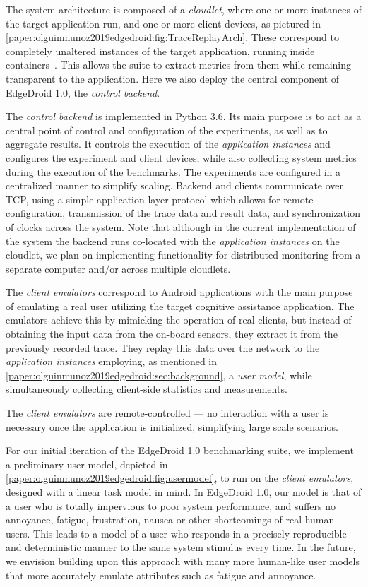 
The system architecture is composed of a \emph{cloudlet}, where one or more instances of the target application run, and one or more client devices, as pictured in \cref{paper:olguinmunoz2019edgedroid:fig:TraceReplayArch}.
These correspond to completely unaltered instances of the target application, running inside containers~\cite{docker}.
This allows the suite to extract metrics from them while remaining transparent to the application.
Here we also deploy the central component of EdgeDroid 1.0, the \emph{control backend}.

The \emph{control backend} is implemented in Python 3.6.
Its main purpose is to act as a central point of control and configuration of the experiments, as well as to aggregate results.
It controls the execution of the \emph{application instances} and configures the experiment and client devices, while also collecting system metrics during the execution of the benchmarks.
The experiments are configured in a centralized manner to simplify scaling.
Backend and clients communicate over TCP, using a simple application-layer protocol which allows for remote configuration, transmission of the trace data and result data, and synchronization of clocks across the system.
Note that although in the current implementation of the system the backend runs co-located with the \emph{application instances} on the cloudlet, we plan on implementing functionality for distributed monitoring from a separate computer and/or across multiple cloudlets.

The \emph{client emulators} correspond to Android applications with the main purpose of emulating a real user utilizing the target cognitive assistance application.
The emulators achieve this by mimicking the operation of real clients, but instead of obtaining the input data from the on-board sensors, they extract it from the previously recorded trace.
They replay this data over the network to the \emph{application instances} employing, as mentioned in \cref{paper:olguinmunoz2019edgedroid:sec:background}, a \emph{user model}, while simultaneously collecting client-side statistics and measurements.

The \emph{client emulators} are remote-controlled --- no interaction with a user is necessary once the application is initialized, simplifying large scale scenarios.

For our initial iteration of the EdgeDroid 1.0 benchmarking suite, we implement a preliminary user model, depicted in \cref{paper:olguinmunoz2019edgedroid:fig:usermodel}, to run on the \emph{client emulators}, designed with a linear task model in mind.
In EdgeDroid 1.0, our model is that of a user who is totally impervious to poor system performance, and suffers no annoyance, fatigue, frustration, nausea or other shortcomings of real human users.
This leads to a model of a user who responds in a precisely reproducible and deterministic manner to the same system stimulus every time.
In the future, we envision building upon this approach with many more human-like user models that more accurately emulate attributes such as fatigue and annoyance.

